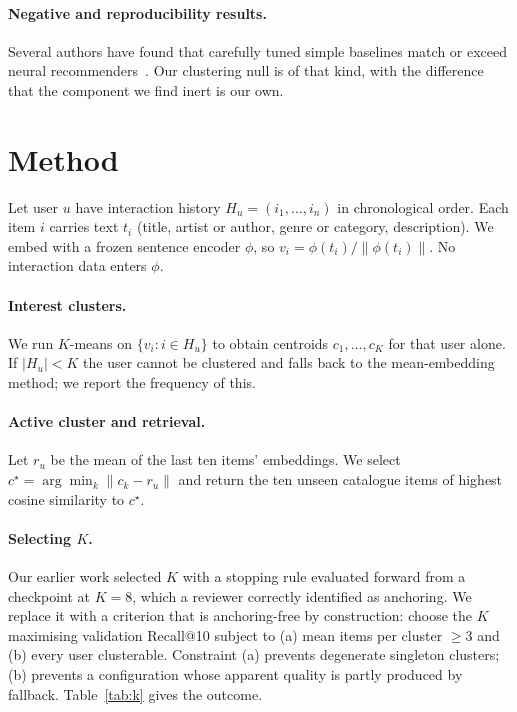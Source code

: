 \documentclass[runningheads]{llncs}
\begin{document}
\paragraph{Negative and reproducibility results.} Several authors have found that carefully
tuned simple baselines match or exceed neural
recommenders~\cite{dacrema2019really,rendle2020neural}. Our clustering null is of that kind,
with the difference that the component we find inert is our own.

\section{Method}

Let user $u$ have interaction history $H_u = (i_1,\dots,i_n)$ in chronological order. Each
item $i$ carries text $t_i$ (title, artist or author, genre or category, description). We
embed with a frozen sentence encoder $\phi$, so $v_i = \phi(t_i)/\lVert\phi(t_i)\rVert$.
No interaction data enters $\phi$.

\paragraph{Interest clusters.} We run $K$-means on $\{v_i : i \in H_u\}$ to obtain
centroids $c_1,\dots,c_K$ for that user alone. If $|H_u| < K$ the user cannot be clustered
and falls back to the mean-embedding method; we report the frequency of this.

\paragraph{Active cluster and retrieval.} Let $r_u$ be the mean of the last ten items'
embeddings. We select $c^\star = \arg\min_k \lVert c_k - r_u \rVert$ and return the ten
unseen catalogue items of highest cosine similarity to $c^\star$.

\paragraph{Selecting $K$.} Our earlier work selected $K$ with a stopping rule evaluated
forward from a checkpoint at $K=8$, which a reviewer correctly identified as anchoring.
We replace it with a criterion that is anchoring-free by construction: choose the $K$
maximising validation Recall@10 subject to (a) mean items per cluster $\geq 3$ and
(b) every user clusterable. Constraint (a) prevents degenerate singleton clusters;
(b) prevents a configuration whose apparent quality is partly produced by fallback.
Table~\ref{tab:k} gives the outcome.
\end{document}
